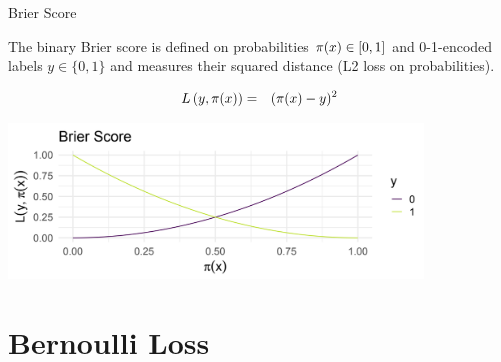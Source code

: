 \begin{vbframe}{Brier Score}

The binary Brier score is defined on probabilities $\pi(x) \in [0, 1]$ and 0-1-encoded labels $y \in \{0, 1\}$ and measures their squared distance (L2 loss on probabilities).

\begin{eqnarray*}
L\left(y, \pi(x)\right) &=& (\pi(x) - y)^2
\end{eqnarray*}

\vspace{0.2cm}
\begin{center}
\includegraphics[width = 11cm ]{figure_man/Brier-score.png} \\
\end{center}


\end{vbframe}



\section{Bernoulli Loss}

